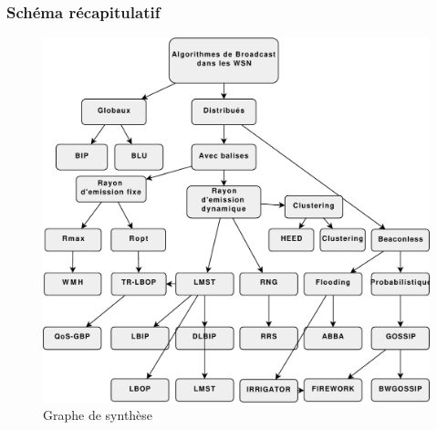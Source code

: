 \subsubsection{Schéma récapitulatif}
\begin{figure}[H]
\centering
\includegraphics[scale=0.8]{Etat_de_l'art/source/classification}
\caption{Graphe de synthèse}
\end{figure} 

